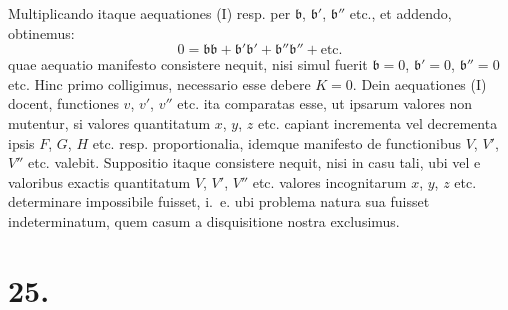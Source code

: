 \documentclass[12pt,a4paper]{book}
\begin{document}
Multiplicando itaque aequationes (I) resp. per $\mathfrak{b}$, $\mathfrak{b}'$, $\mathfrak{b}''$ etc., et addendo, obtinemus:
%
\begin{equation*}
0=\mathfrak{b}\mathfrak{b}+\mathfrak{b}'\mathfrak{b}'+\mathfrak{b}''\mathfrak{b}''+\text{etc.}
\end{equation*}
quae aequatio manifesto consistere nequit, nisi simul fuerit $\mathfrak{b}=0$, $\mathfrak{b}'=0$, $\mathfrak{b}''=0$ etc. Hinc primo colligimus, necessario esse debere $K=0$. Dein aequationes (I) docent, functiones $v$, $v'$, $v''$ etc. ita comparatas esse, ut ipsarum valores non mutentur, si valores quantitatum $x$, $y$, $z$ etc. capiant incrementa vel decrementa ipsis $F$, $G$, $H$ etc. resp. proportionalia, idemque manifesto de functionibus $V$, $V'$, $V''$ etc. valebit. Suppositio itaque consistere nequit, nisi in casu tali, ubi vel e valoribus exactis quantitatum $V$, $V'$, $V''$ etc. valores incognitarum $x$, $y$, $z$ etc. determinare impossibile fuisset, i.~e. ubi problema natura sua fuisset indeterminatum, quem casum a disquisitione nostra exclusimus.

\section*{25.}
\label{sec:art25}
\end{document}
